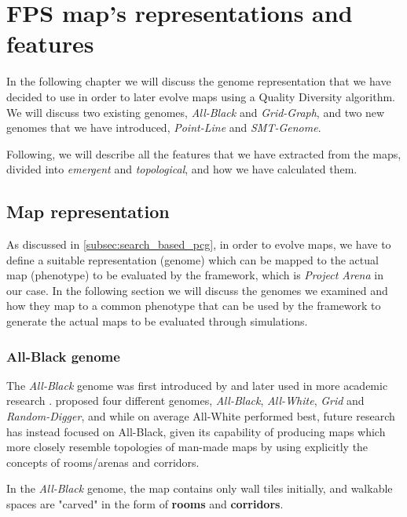 \chapter{FPS map's representations and features}

In the following chapter we will discuss the genome representation that we have decided to use in order to later evolve maps using a Quality Diversity algorithm. We will discuss two existing genomes, \textit{All-Black} and \textit{Grid-Graph}, and two new genomes that we have introduced, \textit{Point-Line} and \textit{SMT-Genome}. 

Following, we will describe all the features that we have extracted from the maps, divided into \textit{emergent} and \textit{topological}, and how we have calculated them. 

\section{Map representation}
\label{sec:map_genomes}
As discussed in \cref{subsec:search_based_pcg}, in order to evolve maps, we have to define a suitable representation (genome) which can be mapped to the actual map (phenotype) to be evaluated by the framework, which is \textit{Project Arena} in our case. In the following section we will discuss the genomes we examined and how they map to a common phenotype that can be used by the framework to generate the actual maps to be evaluated through simulations.
\subsection{All-Black genome}
\label{subsec:all_black}
The \textit{All-Black} genome was first introduced by \citet{cardamone_evolving_2011} and later used in more academic research \cite{lanzi_evolving_2014} \cite{loiacono_fight_2017} \cite{bari_evolutionary-based_2023}. \citeauthor{cardamone_evolving_2011} proposed four different genomes, \textit{All-Black}, \textit{All-White}, \textit{Grid} and \textit{Random-Digger}, and while on average All-White performed best, future research has instead focused on All-Black, given its capability of producing maps which more closely resemble topologies of man-made maps by using explicitly the concepts of rooms/arenas and corridors.

In the \textit{All-Black} genome, the map contains only wall tiles initially, and walkable spaces are "carved" in the form of \textbf{rooms} and \textbf{corridors}.

